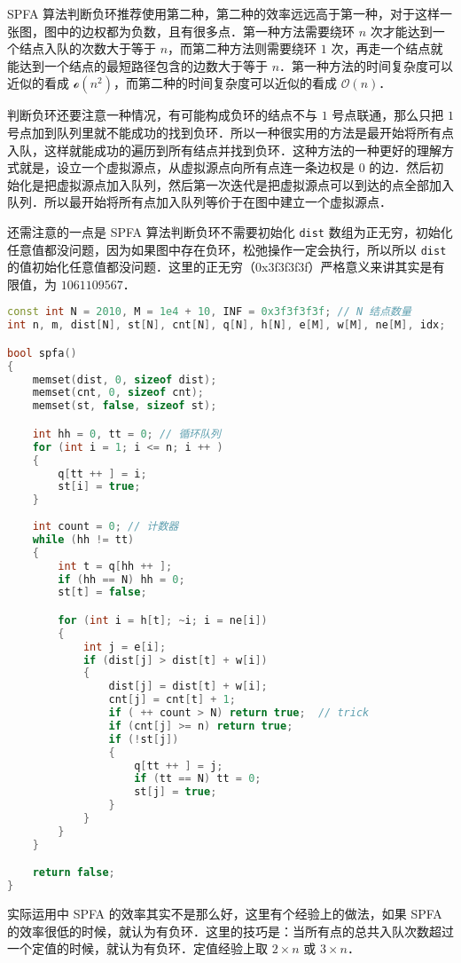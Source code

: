 SPFA 算法判断负环推荐使用第二种，第二种的效率远远高于第一种，对于这样一张图，图中的边权都为负数，且有很多点．第一种方法需要绕环 $n$ 次才能达到一个结点入队的次数大于等于 $n$，而第二种方法则需要绕环 $1$ 次，再走一个结点就能达到一个结点的最短路径包含的边数大于等于 $n$．第一种方法的时间复杂度可以近似的看成 $\mathcal{o}(n^2)$，而第二种的时间复杂度可以近似的看成 $\mathcal{O}(n)$．

判断负环还要注意一种情况，有可能构成负环的结点不与 $1$ 号点联通，那么只把 $1$ 号点加到队列里就不能成功的找到负环．所以一种很实用的方法是最开始将所有点入队，这样就能成功的遍历到所有结点并找到负环．这种方法的一种更好的理解方式就是，设立一个虚拟源点，从虚拟源点向所有点连一条边权是 $0$ 的边．然后初始化是把虚拟源点加入队列，然后第一次迭代是把虚拟源点可以到达的点全部加入队列．所以最开始将所有点加入队列等价于在图中建立一个虚拟源点．

还需注意的一点是 SPFA 算法判断负环不需要初始化 \verb|dist| 数组为正无穷，初始化任意值都没问题，因为如果图中存在负环，松弛操作一定会执行，所以所以 \verb|dist| 的值初始化任意值都没问题．这里的正无穷（0x3f3f3f3f）严格意义来讲其实是有限值，为 $1061109567$．

\begin{lstlisting}[language=cpp]
const int N = 2010, M = 1e4 + 10, INF = 0x3f3f3f3f; // N 结点数量
int n, m, dist[N], st[N], cnt[N], q[N], h[N], e[M], w[M], ne[M], idx;

bool spfa()
{
    memset(dist, 0, sizeof dist);
    memset(cnt, 0, sizeof cnt);
    memset(st, false, sizeof st);

    int hh = 0, tt = 0; // 循环队列
    for (int i = 1; i <= n; i ++ )
    {
        q[tt ++ ] = i;
        st[i] = true;
    }
    
    int count = 0; // 计数器
    while (hh != tt)
    {
        int t = q[hh ++ ];
        if (hh == N) hh = 0;
        st[t] = false;

        for (int i = h[t]; ~i; i = ne[i])
        {
            int j = e[i];
            if (dist[j] > dist[t] + w[i])
            {
                dist[j] = dist[t] + w[i];
                cnt[j] = cnt[t] + 1;
                if ( ++ count > N) return true;  // trick
                if (cnt[j] >= n) return true;
                if (!st[j])
                {
                    q[tt ++ ] = j;
                    if (tt == N) tt = 0;    
                    st[j] = true;
                }
            }
        }
    }

    return false;
}
\end{lstlisting}

实际运用中 SPFA 的效率其实不是那么好，这里有个经验上的做法，如果 SPFA 的效率很低的时候，就认为有负环．这里的技巧是：当所有点的总共入队次数超过一个定值的时候，就认为有负环．定值经验上取 $2 \times n$ 或 $3 \times n$．